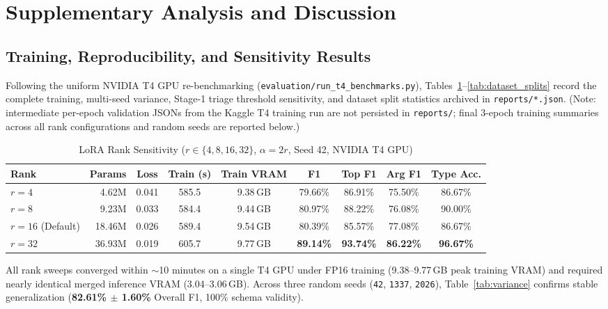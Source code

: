 \documentclass[11pt,a4paper]{article}
\begin{document}
\clearpage
\section{Supplementary Analysis and Discussion}

\subsection{Training, Reproducibility, and Sensitivity Results}
Following the uniform NVIDIA T4 GPU re-benchmarking (\texttt{evaluation/run\_t4\_benchmarks.py}), Tables~\ref{tab:rank_sweep}--\ref{tab:dataset_splits} record the complete training, multi-seed variance, Stage-1 triage threshold sensitivity, and dataset split statistics archived in \texttt{reports/*.json}. (Note: intermediate per-epoch validation JSONs from the Kaggle T4 training run are not persisted in \texttt{reports/}; final 3-epoch training summaries across all rank configurations and random seeds are reported below.)

\begin{table}[htbp]
\centering
\caption{LoRA Rank Sensitivity ($r \in \{4, 8, 16, 32\}$, $\alpha = 2r$, Seed 42, NVIDIA T4 GPU)}
\label{tab:rank_sweep}
\small
\begin{tabular}{@{}l r c c c c c c c@{}}
\toprule
\textbf{Rank} & \textbf{Params} & \textbf{Loss} & \textbf{Train (s)} & \textbf{Train VRAM} & \textbf{F1} & \textbf{Top F1} & \textbf{Arg F1} & \textbf{Type Acc.} \\
\midrule
$r=4$ & 4.62M & 0.041 & 585.5 & 9.38\,GB & 79.66\% & 86.91\% & 75.50\% & 86.67\% \\
$r=8$ & 9.23M & 0.033 & 584.4 & 9.44\,GB & 80.97\% & 88.22\% & 76.08\% & 90.00\% \\
$r=16$ (Default) & 18.46M & 0.026 & 589.4 & 9.54\,GB & 80.39\% & 85.57\% & 77.08\% & 86.67\% \\
$r=32$ & 36.93M & 0.019 & 605.7 & 9.77\,GB & \textbf{89.14\%} & \textbf{93.74\%} & \textbf{86.22\%} & \textbf{96.67\%} \\
\bottomrule
\end{tabular}
\end{table}

All rank sweeps converged within $\sim$10 minutes on a single T4 GPU under FP16 training (9.38--9.77\,GB peak training VRAM) and required nearly identical merged inference VRAM (3.04--3.06\,GB). Across three random seeds (\texttt{42}, \texttt{1337}, \texttt{2026}), Table~\ref{tab:variance} confirms stable generalization (\textbf{82.61\% $\pm$ 1.60\%} Overall F1, 100\% schema validity).
\end{document}
